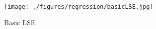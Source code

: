\begin{figure}[ht!]
\texttt{[image: ./figures/regression/basicLSE.jpg]}
\centering
\caption{Basic LSE}
\label{fig:basicLSE}
\end{figure}
